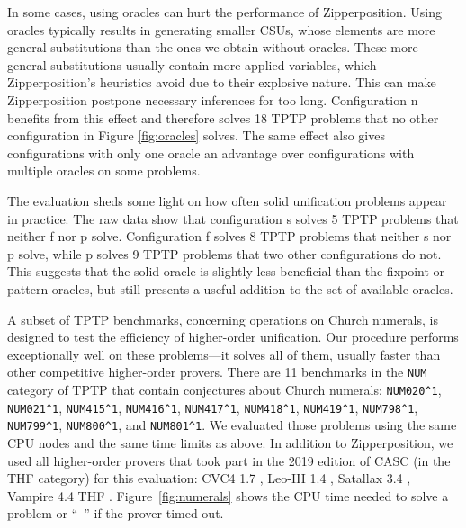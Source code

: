 In some cases, using oracles can hurt the performance of
Zipperposition. Using oracles typically results in generating smaller
CSUs, whose elements are more general substitutions than the ones we obtain without oracles. 
These more general substitutions usually
contain more applied variables, which Zipperposition's heuristics avoid due to
their explosive nature. This can make Zipperposition postpone necessary inferences for too long. 
Configuration n benefits from this effect and therefore solves 18 TPTP problems that no other configuration in Figure
\ref{fig:oracles} solves. The same effect also gives configurations with only one oracle 
an advantage over configurations with multiple oracles on some problems.

The evaluation sheds some light on how often solid unification problems appear in practice. 
The raw data show that
configuration s solves 5 TPTP problems that neither f nor p solve. Configuration
f solves 8 TPTP problems that neither s nor p solve, while p solves 9 TPTP
problems that two other configurations do not. This suggests that the solid oracle
is slightly less beneficial than the fixpoint or pattern oracles, but still presents a
useful addition to the set of available oracles.

A subset of TPTP benchmarks, concerning operations on Church numerals, is designed to test the efficiency of
higher-order unification. Our procedure performs exceptionally well
on these problems---it solves all of them, usually
faster than other competitive higher-order provers.
  There are 11 benchmarks in the \texttt{NUM} category of TPTP that contain conjectures about
  Church numerals: \texttt{NUM020\^{}1}, \texttt{NUM021\^{}1}, \texttt{NUM415\^{}1},
  \texttt{NUM416\^{}1}, \texttt{NUM417\^{}1}, \texttt{NUM418\^{}1}, \texttt{NUM419\^{}1}, \texttt{NUM798\^{}1},
  \texttt{NUM799\^{}1}, \texttt{NUM800\^{}1}, and \texttt{NUM801\^{}1}.
  We evaluated those problems using the same CPU nodes and the same time limits 
  as above. In addition to Zipperposition, we used
  all higher-order provers that took part in the 2019 edition of CASC \cite{gs-19-casc27} (in the THF category) for this evaluation: CVC4
  1.7 \cite{cbetal-11-cvc4}, Leo-III 1.4 \cite{sb-21-leo3}, Satallax 3.4
  \cite{cb-12-satallax}, Vampire 4.4 THF \cite{lkav-13-vampire}. Figure~\ref{fig:numerals}
  shows the CPU time needed to solve a problem or ``--'' if the prover timed out.
  \pagebreak[2]

